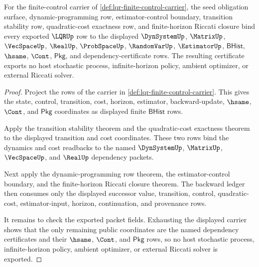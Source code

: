 \begin{theorem}
\label{thm:lqr-scoped-dependency-certificate}
For the finite-control carrier of \autoref{def:lqr-finite-control-carrier}, the seed obligation surface, dynamic-programming row, estimator-control boundary, transition stability row, quadratic-cost exactness row, and finite-horizon Riccati closure bind every exported $\LQRUp$ row to the displayed $\DynSystemUp$, $\MatrixUp$, $\VecSpaceUp$, $\RealUp$, $\ProbSpaceUp$, $\RandomVarUp$, $\EstimatorUp$, $\mathsf{BHist}$, $\hsame$, $\Cont$, $\mathsf{Pkg}$, and dependency-certificate rows. The resulting certificate exports no host stochastic process, infinite-horizon policy, ambient optimizer, or external Riccati solver.
\end{theorem}
\begin{proof}
Project the rows of the carrier in \autoref{def:lqr-finite-control-carrier}. This gives the state, control, transition, cost, horizon, estimator, backward-update, $\hsame$, $\Cont$, and $\mathsf{Pkg}$ coordinates as displayed finite $\mathsf{BHist}$ rows.

Apply the transition stability theorem and the quadratic-cost exactness theorem to the displayed transition and cost coordinates. These two rows bind the dynamics and cost readbacks to the named $\DynSystemUp$, $\MatrixUp$, $\VecSpaceUp$, and $\RealUp$ dependency packets.

Next apply the dynamic-programming row theorem, the estimator-control boundary, and the finite-horizon Riccati closure theorem. The backward ledger then consumes only the displayed successor value, transition, control, quadratic-cost, estimator-input, horizon, continuation, and provenance rows.

It remains to check the exported packet fields. Exhausting the displayed carrier shows that the only remaining public coordinates are the named dependency certificates and their $\hsame$, $\Cont$, and $\mathsf{Pkg}$ rows, so no host stochastic process, infinite-horizon policy, ambient optimizer, or external Riccati solver is exported.
\end{proof}

